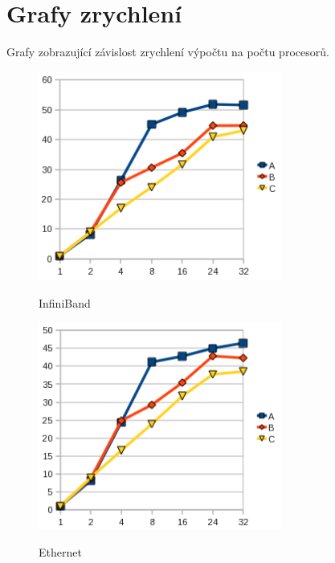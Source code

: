 \documentclass[12pt]{article}
\begin{document}
\section{Grafy zrychlení}
Grafy zobrazující závislost zrychlení výpočtu na počtu procesorů.
\begin{figure}[H]
\begin{center}
\includegraphics[width=8cm]{grafy-zprava/zrychleniinf.png}
\label{fig:zrychleniinf}
\caption{InfiniBand}
\end{center}
\end{figure}

\begin{figure}[H]
\begin{center}
\includegraphics[width=8cm]{grafy-zprava/zrychlenieth.png}
\label{fig:zrychlenieth}
\caption{Ethernet}
\end{center}
\end{figure}
\end{document}
